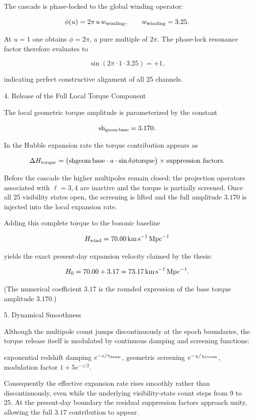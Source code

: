 The cascade is phase-locked to the global winding operator:

\[
\phi(u) = 2\pi\, u\, w_{\rm winding}, \qquad w_{\rm winding}=3.25.
\]

At \(u=1\) one obtains \(\phi=2\pi\), a pure multiple of \(2\pi\). The phase-lock resonance factor therefore evaluates to

\[
\sin(2\pi\cdot 1\cdot 3.25) = +1,
\]

indicating perfect constructive alignment of all 25 channels.

4. Release of the Full Local Torque Component

The local geometric torque amplitude is parameterized by the constant

\[
{\rm sh}_{\rm geom\,base} = 3.170.
\]

In the Hubble expansion rate the torque contribution appears as

\[
\Delta H_{\rm torque} = \bigl({\rm sh}{\rm geom\,base}\cdot a\cdot\sin\delta\phi{\rm torque}\bigr)\times\text{suppression factors}.
\]

Before the cascade the higher multipoles remain closed; the projection operators associated with \(\ell=3,4\) are inactive and the torque is partially screened. Once all 25 visibility states open, the screening is lifted and the full amplitude \(3.170\) is injected into the local expansion rate.

Adding this complete torque to the bosonic baseline

\[
H_{\rm wind} = 70.00\,{\rm km\,s}^{-1}\,{\rm Mpc}^{-1}
\]

yields the exact present-day expansion velocity claimed by the thesis:

\[
H_0 = 70.00 + 3.17 = 73.17\,{\rm km\,s}^{-1}\,{\rm Mpc}^{-1}.
\]

(The numerical coefficient \(3.17\) is the rounded expression of the base torque amplitude \(3.170\).)

5. Dynamical Smoothness

Although the multipole count jumps discontinuously at the epoch boundaries, the torque release itself is modulated by continuous damping and screening functions:

exponential redshift damping \(e^{-z/\tau_{\rm damp}}\),
geometric screening \(e^{-\chi/\chi_{\rm screen}}\),
modulation factor \(1+5e^{-z/2}\).

Consequently the effective expansion rate rises smoothly rather than discontinuously, even while the underlying visibility-state count steps from 9 to 25. At the present-day boundary the residual suppression factors approach unity, allowing the full \(3.17\) contribution to appear.

